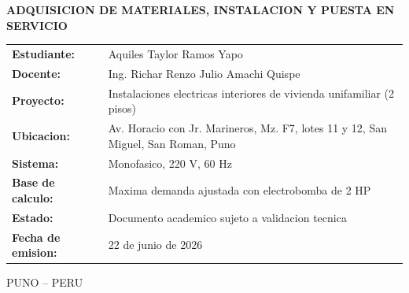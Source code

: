 \begin{titlepage}
\begin{minipage}{5.20in}
\vspace{0.32in}
{\fontsize{11}{14}\selectfont\bfseries
ADQUISICION DE MATERIALES, INSTALACION Y PUESTA EN SERVICIO\par}

\vspace{0.38in}
\begin{flushleft}
\fontsize{10}{13}\selectfont
\renewcommand{\arraystretch}{1.23}
\begin{tabular}{>{\bfseries}p{1.55in}p{3.35in}}
Estudiante: & Aquiles Taylor Ramos Yapo \\
Docente: & Ing. Richar Renzo Julio Amachi Quispe \\
Proyecto: & Instalaciones electricas interiores de vivienda unifamiliar (2 pisos) \\
Ubicacion: & Av. Horacio con Jr. Marineros, Mz. F7, lotes 11 y 12, San Miguel, San Roman, Puno \\
Sistema: & Monofasico, 220 V, 60 Hz \\
Base de calculo: & Maxima demanda ajustada con electrobomba de 2 HP \\
Estado: & Documento academico sujeto a validacion tecnica \\
Fecha de emision: & 22 de junio de 2026 \\
\end{tabular}
\end{flushleft}

\vfill
{\fontsize{10}{12}\selectfont PUNO -- PERU\par}
{\fontsize{9}{11}\par}
\end{minipage}

\end{titlepage}
